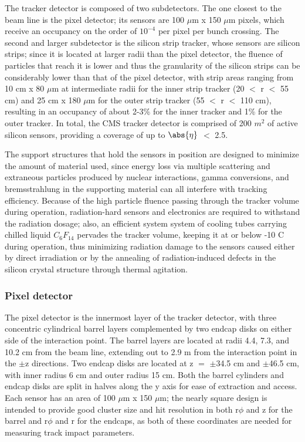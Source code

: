The tracker detector is composed of two subdetectors. The one closest to the beam line is the pixel detector; its sensors are 100 $\mu$m x 150 $\mu$m pixels, which receive an occupancy on the order of $10^{-4}$ per pixel per bunch crossing. The second and larger subdetector is the silicon strip tracker, whose sensors are silicon strips; since it is located at larger radii than the pixel detector, the fluence of particles that reach it is lower and thus the granularity of the silicon strips can be considerably lower than that of the pixel detector, with strip areas ranging from 10 cm x 80 $\mu$m at intermediate radii for the inner strip tracker (20 $<$ r $<$ 55 cm) and 25 cm x 180 $\mu$m for the outer strip tracker (55 $<$ r $<$ 110 cm), resulting in an occupancy of about 2-3\% for the inner tracker and 1\% for the outer tracker. In total, the CMS tracker detector is comprised of 200 $m^{2}$ of active silicon sensors, providing a coverage of up to $\abs{\eta}$ $<$ 2.5.

The support structures that hold the sensors in position are designed to minimize the amount of material used, since energy loss via multiple scattering and extraneous particles produced by nuclear interactions, gamma conversions, and bremsstrahlung in the supporting material can all interfere with tracking efficiency. Because of the high particle fluence passing through the tracker volume during operation, radiation-hard sensors and electronics are required to withstand the radiation dosage; also, an efficient system system of cooling tubes carrying chilled liquid $C_{6}F_{14}$ pervades the tracker volume, keeping it at or below -10 C during operation, thus minimizing radiation damage to the sensors caused either by direct irradiation or by the annealing of radiation-induced defects in the silicon crystal structure through thermal agitation.

\subsubsection{Pixel detector\label{sec:cms-pixel}}

The pixel detector is the innermost layer of the tracker detector, with three concentric cylindrical barrel layers complemented by two endcap disks on either side of the interaction point. The barrel layers are located at radii 4.4, 7.3, and 10.2 cm from the beam line, extending out to 2.9 m from the interaction point in the $\pm$z directions. Two endcap disks are located at z $=$ $\pm$34.5 cm and $\pm$46.5 cm, with inner radius 6 cm and outer radius 15 cm. Both the barrel cylinders and endcap disks are split in halves along the y axis for ease of extraction and access. Each sensor has an area of 100 $\mu$m x 150 $\mu$m; the nearly square design is intended to provide good cluster size and hit resolution in both r$\phi$ and z for the barrel and r$\phi$ and r for the endcaps, as both of these coordinates are needed for measuring track impact parameters.

